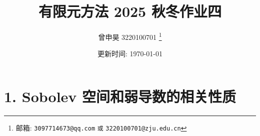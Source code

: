 \documentclass[a4paper]{article}
\begin{document}
\title{有限元方法 2025 秋冬作业四}

\author{曾申昊 3220100701
  \thanks{邮箱: \texttt{3097714673@qq.com}
                            \texttt{或} \texttt{3220100701@zju.edu.cn}}}


\date{更新时间: \today}

\maketitle


\section*{1. Sobolev 空间和弱导数的相关性质}
\end{document}
